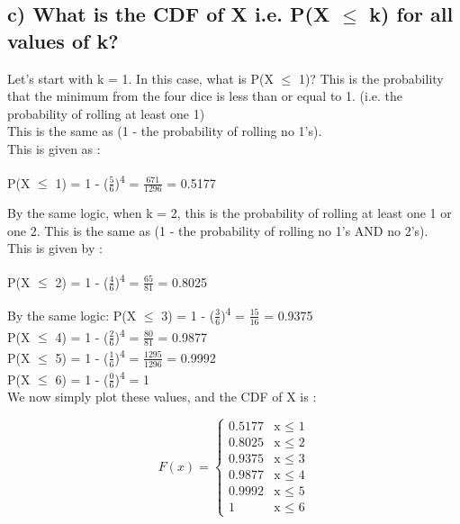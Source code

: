 \documentclass{report}
\begin{document}
        \subsection*{c) What is the CDF of X i.e. P(X $\leq$ k) for all values of k?}
        Let's start with k = 1. In this case, what is P(X $\leq$ 1)?
        This is the probability that the minimum from the four dice is less than or equal to 1. (i.e. the probability of rolling at least one 1)\\
        This is the same as (1 - the probability of rolling no 1's).\\
        This is given as :
        \begin{center}
            P(X $\leq$ 1) = 1 - ($\frac{5}{6}$)\textsuperscript{4} = $\frac{671}{1296}$ = 0.5177
        \end{center}
        
        By the same logic, when k = 2, this is the probability of rolling at least one 1 or one 2. This is the same as (1 - the probability of rolling no 1's AND no 2's).\\
        This is given by :
        \begin{center}
            P(X $\leq$ 2) = 1 - ($\frac{4}{6}$)\textsuperscript{4} = $\frac{65}{81}$ = 0.8025
        \end{center}

        By the same logic: 
        P(X $\leq$ 3) = 1 - ($\frac{3}{6}$)\textsuperscript{4} = $\frac{15}{16}$ = 0.9375\\
        P(X $\leq$ 4) = 1 - ($\frac{2}{6}$)\textsuperscript{4} = $\frac{80}{81}$ = 0.9877\\
        P(X $\leq$ 5) = 1 - ($\frac{1}{6}$)\textsuperscript{4} = $\frac{1295}{1296}$ = 0.9992\\
        P(X $\leq$ 6) = 1 - ($\frac{0}{6}$)\textsuperscript{4} = 1\\
        We now simply plot these values, and the CDF of X is :

        \begin{equation}
            F(x) =
              \begin{cases}
                0.5177 & \text{x $\leq$ 1}\\
                0.8025 & \text{x $\leq$ 2}\\
                0.9375 & \text{x $\leq$ 3}\\
                0.9877 & \text{x $\leq$ 4}\\
                0.9992 & \text{x $\leq$ 5}\\
                1 & \text{x $\leq$ 6}
              \end{cases}       
        \end{equation}
\end{document}
